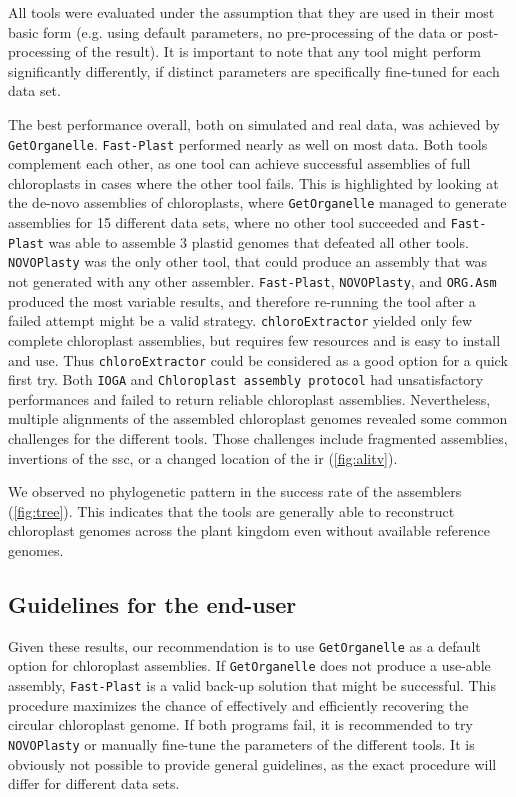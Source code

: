 \documentclass{bmcart}
\newcommand{\formatprogramnames}[1]{\texttt{#1}}
\newcommand{\ce}{\formatprogramnames{chloroExtractor}}
\newcommand{\oa}{\formatprogramnames{ORG.Asm}}
\newcommand{\fp}{\formatprogramnames{Fast-Plast}}
\newcommand{\ioga}{\formatprogramnames{IOGA}}
\newcommand{\np}{\formatprogramnames{NOVOPlasty}}
\newcommand{\go}{\formatprogramnames{GetOrganelle}}
\newcommand{\cassp}{\formatprogramnames{Chloroplast assembly protocol}}
\begin{document}
All tools were evaluated under the assumption that they are used in their most basic form (e.g. using default parameters, no pre-processing of the data or post-processing of the result).
It is important to note that any tool might perform significantly differently, if distinct parameters are specifically fine-tuned for each data set.

The best performance overall, both on simulated and real data, was achieved by \go{}. \fp{} performed nearly as well on most data.
Both tools complement each other, as one tool can achieve successful assemblies of full chloroplasts in cases where the other tool fails. 
This is highlighted by looking at the de-novo assemblies of chloroplasts, where \go{} managed to generate assemblies for 15 different data sets, where no other tool succeeded and \fp{} was able to assemble 3 plastid genomes that defeated all other tools. \np{} was the only other tool, that could produce an assembly that was not generated with any other assembler. 
\fp{}, \np{}, and \oa{} produced the most variable results, and therefore re-running the tool after a failed attempt might be a valid strategy.
\ce{} yielded only few complete chloroplast assemblies, but requires few resources and is easy to install and use. 
Thus \ce{} could be considered as a good option for a quick first try.
Both \ioga{} and \cassp{} had unsatisfactory performances and failed to return reliable chloroplast assemblies.
Nevertheless, multiple alignments of the assembled chloroplast genomes revealed some common challenges for the different tools. 
Those challenges include fragmented assemblies, invertions of the \gls{ssc}, or a changed location of the \gls{ir} (\cref{fig:alitv}).

We observed no phylogenetic pattern in the success rate of the assemblers (\cref{fig:tree}).
This indicates that the tools are generally able to reconstruct chloroplast genomes across the plant kingdom even without available reference genomes.

\subsection*{Guidelines for the end-user}
Given these results, our recommendation is to use \go{} as a default option for chloroplast assemblies. 
If \go{} does not produce a use-able assembly, \fp{} is a valid back-up solution that might be successful. 
This procedure maximizes the chance of effectively and efficiently recovering the circular chloroplast genome.
If both programs fail, it is recommended to try \np{} or manually fine-tune the parameters of the different tools.
It is obviously not possible to provide general guidelines, as the exact procedure will differ for different data sets.
 
\end{document}
